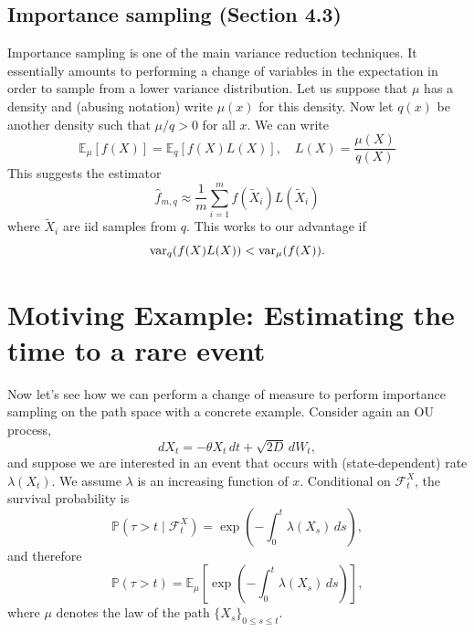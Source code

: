 \documentclass[11pt]{article}
\begin{document}
\subsection*{Importance sampling (Section 4.3)}
Importance sampling is one of the main variance reduction techniques. It essentially amounts to performing a change of variables in the expectation in order to sample from a lower variance distribution. Let us suppose that $\mu$ has a density and (abusing notation) write $\mu(x)$ for this density. Now let $q(x)$ be another density such that $\mu/q>0$ for all $x$. 
We can write
\begin{equation}
{\mathbb E}_{\mu}[f(X)] = {\mathbb E}_{q}\left[f(X)L(X)\right],\quad L(X) = \frac{\mu(X)}{q(X)}
\end{equation}
This suggests the estimator 
\begin{equation}
\hat{f}_{m,q} \approx \frac{1}{m}\sum_{i=1}^mf(\tilde{X}_i)L(\tilde{X}_i)
\end{equation}
where $\tilde{X}_i$ are iid samples from $q$. This works to our advantage if 
\begin{equation}
{\rm var}_q(f(X)L(X)) < {\rm var}_{\mu}(f(X)). 
\end{equation}


\section*{Motiving Example: Estimating the time to a rare event}

 Now let's see how we can perform a change of measure to perform importance sampling on the path space with a concrete example. Consider again an OU process, 
\begin{equation}\label{eq:sdeexample}
dX_t = -\theta X_t\,dt + \sqrt{2D}\,dW_t,
\end{equation}
and suppose we are interested in an event that occurs with (state-dependent) rate $\lambda(X_t)$. We assume $\lambda$ is an increasing function of $x$. Conditional on ${\mathcal F}_t^X$, the survival probability is
\begin{equation}
{\mathbb P}(\tau>t\mid {\mathcal F}_t^X)
=
\exp\!\left(-\int_0^t \lambda(X_s)\,ds\right),
\end{equation}
and therefore
\begin{equation}
{\mathbb P}(\tau>t)
=
{\mathbb E}_{\mu}\!\left[
\exp\!\left(-\int_0^t \lambda(X_s)\,ds\right)
\right],
\end{equation}
where $\mu$ denotes the law of the path $\{X_s\}_{0\le s\le t}$.
\end{document}
